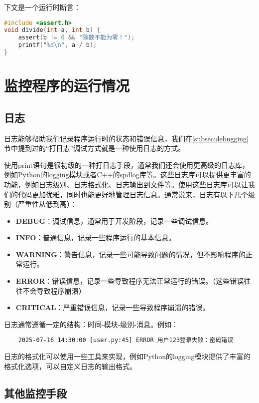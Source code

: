 \documentclass[../main.tex]{subfiles}
\begin{document}
下文是一个运行时断言：
\begin{lstlisting}[language=C]
#include <assert.h>
void divide(int a, int b) {
    assert(b != 0 && "除数不能为零！");
    printf("%d\n", a / b);
}
\end{lstlisting}

\section{监控程序的运行情况}\label{sec:monitoring}

\subsection{日志}\label{subsec:logging}

日志能够帮助我们记录程序运行时的状态和错误信息，我们在\ref{subsec:debugging}节中提到过的“打日志”调试方式就是一种使用日志的方式。

使用print语句是很初级的一种打日志手段，通常我们还会使用更高级的日志库，例如Python的logging模块或者C++的spdlog库等。这些日志库可以提供更丰富的功能，例如日志级别、日志格式化、日志输出到文件等。使用这些日志库可以让我们的代码更加优雅，同时也能更好地管理日志信息。通常说来，日志有以下几个级别（严重性从低到高）：
\begin{itemize}
  \item \textbf{DEBUG}：调试信息，通常用于开发阶段，记录一些调试信息。
  \item \textbf{INFO}：普通信息，记录一些程序运行的基本信息。
  \item \textbf{WARNING}：警告信息，记录一些可能导致问题的情况，但不影响程序的正常运行。
  \item \textbf{ERROR}：错误信息，记录一些导致程序无法正常运行的错误。（这些错误往往不会导致程序崩溃）
  \item \textbf{CRITICAL}：严重错误信息，记录一些导致程序崩溃的错误。
\end{itemize}

日志通常遵循一定的结构：时间-模块-级别-消息。例如：
\begin{lstlisting}
    2025-07-16 14:30:00 [user.py:45] ERROR 用户123登录失败：密码错误
\end{lstlisting}

日志的格式化可以使用一些工具来实现，例如Python的logging模块提供了丰富的格式化选项，可以自定义日志的输出格式。

\subsection{其他监控手段}\label{subsec:other-monitoring}
\end{document}
